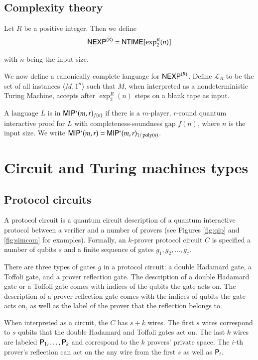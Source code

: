 \subsection{Complexity theory}

\begin{definition}
	Let $R$ be a positive integer. Then we define
	\[
		{\sf NEXP}^{(R)} = {\sf NTIME}[\exp^R_2(n)]
	\]
\end{definition}
with $n$ being the input size. 

We now define a canonically complete language for ${\sf NEXP}^{(R)}$. Define $\mathcal{L}_R$ to be the set of all instances $\langle M, 1^n \rangle$ such that $M$, when interpreted as a nondeterministic Turing Machine, accepts after $\exp^R_2(n)$ steps on a blank tape as input.

\begin{definition}[$\MIPstar$]
	A language $L$ is in ${\sf MIP^*}(m,r)_{f(n)}$ if there is a $m$-player, $r$-round quantum interactive proof for $L$ with completeness-soundness gap $f(n)$, where $n$ is the input size. We write ${\sf MIP^*}(m,r) = {\sf MIP^*}(m,r)_{1/\operatorname{poly}(n)}$.
\end{definition}


\section{Circuit and Turing machines types}

\subsection{Protocol circuits} 
A protocol circuit is a quantum circuit description of a quantum interactive protocol between a verifier and a number of provers (see Figures \ref{fig:qip} and \ref{fig:simcom} for examples). Formally, an $k$-prover protocol circuit $C$ is specified a number of qubits $s$ and a finite sequence of gates $g_1,g_2,\ldots,g_\tau$. 

There are three types of gates $g$ in a protocol circuit: a double Hadamard gate, a Toffoli gate, and a prover reflection gate. The description of a double Hadamard gate or a Toffoli gate comes with indices of the qubits the gate acts on. The description of a prover reflection gate comes with the indices of qubits the gate acts on, as well as the label of the prover that the reflection belongs to.

When interpreted as a circuit, the $C$ has $s + k$ wires. The first $s$ wires correspond to $s$ qubits that the double Hadamard and Toffoli gates act on. The last $k$ wires are labeled ${\mathsf{P}}_1,\ldots,{\mathsf{P}}_k$ and correspond to the $k$ provers' private space. The $i$-th prover's reflection can act on the any wire from the first $s$ as well as ${\mathsf{P}}_i$.

